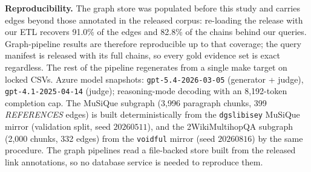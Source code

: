 \textbf{Reproducibility.} The graph store was populated before this
study and carries edges beyond those annotated in the released corpus:
re-loading the release with our ETL recovers 91.0\% of the edges and
82.8\% of the chains behind our queries. Graph-pipeline results are
therefore reproducible up to that coverage; the query manifest is
released with its full chains, so every gold evidence set is exact
regardless. The rest of the pipeline regenerates from a
single make target on locked CSVs. Azure model snapshots:
\texttt{gpt-5.4-}\allowbreak\texttt{2026-03-05} (generator + judge),
\texttt{gpt-4.1-2025-04-14} (judge); reasoning-mode decoding with an
8{,}192-token completion cap. The MuSiQue
subgraph (3{,}996 paragraph chunks, 399 \textit{REFERENCES} edges) is
built deterministically from the \texttt{dgslibisey}
MuSiQue mirror (validation split, seed $20260511$), and the
2WikiMultihopQA subgraph (2{,}000 chunks, 332 edges) from the
\texttt{voidful} mirror (seed $20260816$) by the same procedure.
The graph pipelines read a file-backed store built from the released
link annotations, so no database service is needed to reproduce them.
